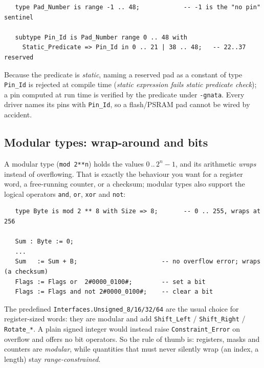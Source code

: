 \begin{lstlisting}
   type Pad_Number is range -1 .. 48;            -- -1 is the "no pin" sentinel

   subtype Pin_Id is Pad_Number range 0 .. 48 with
     Static_Predicate => Pin_Id in 0 .. 21 | 38 .. 48;   -- 22..37 reserved
\end{lstlisting}

Because the predicate is \emph{static}, naming a reserved pad as a constant of
type \texttt{Pin\_Id} is rejected at compile time (\emph{static expression fails
static predicate check}); a pin computed at run time is verified by the predicate
under \texttt{-gnata}. Every driver names its pins with \texttt{Pin\_Id}, so a
flash/PSRAM pad cannot be wired by accident.


\subsection{Modular types: wrap-around and bits}

A modular type (\texttt{mod 2**n}) holds the values $0\,..\,2^n-1$, and its
arithmetic \emph{wraps} instead of overflowing. That is exactly the behaviour you
want for a register word, a free-running counter, or a checksum; modular types
also support the logical operators \texttt{and}, \texttt{or}, \texttt{xor} and
\texttt{not}:

\begin{lstlisting}
   type Byte is mod 2 ** 8 with Size => 8;       -- 0 .. 255, wraps at 256

   Sum : Byte := 0;
   ...
   Sum   := Sum + B;                       -- no overflow error; wraps (a checksum)
   Flags := Flags or  2#0000_0100#;        -- set a bit
   Flags := Flags and not 2#0000_0100#;    -- clear a bit
\end{lstlisting}

The predefined \texttt{Interfaces.Unsigned\_8/16/32/64} are the usual choice for
register-sized words: they are modular and add \texttt{Shift\_Left} /
\texttt{Shift\_Right} / \texttt{Rotate\_*}. A plain signed integer would instead
raise \texttt{Constraint\_Error} on overflow and offers no bit operators. So the
rule of thumb is: registers, masks and counters are \emph{modular}, while
quantities that must never silently wrap (an index, a length) stay
\emph{range-constrained}.

